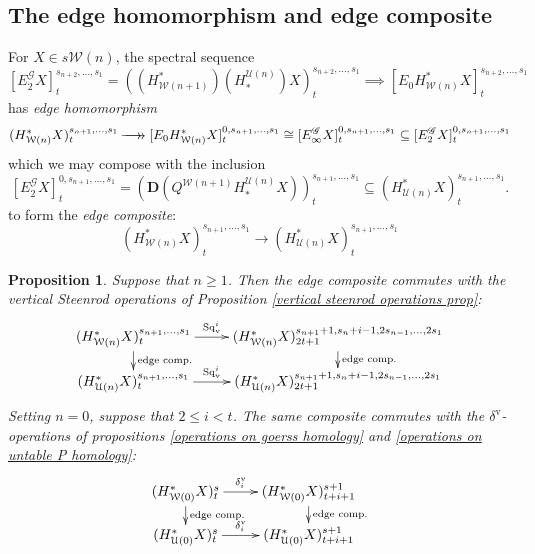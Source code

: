 \documentclass[11pt]{amsart} \renewcommand{\baselinestretch}{1.2}
\theoremstyle{plain}
\newtheorem{prop}[thm]{Proposition}
\numberwithin{equation}{section} %
\theoremstyle{plain}
\newtheorem{prop}[thm]{Proposition}
\numberwithin{equation}{chapter} %
\renewcommand{\to}{\longrightarrow}
\newcommand{\scrG}{\mathscr{G}}
\newcommand{\calU}{\mathcal{U}}
\newcommand{\calw}{\mathcal{W}}
\newcommand{\BSW}{{\scrG}}
\newcommand{\epi}{{\,\makebox[0cm][l]{\ensuremath\to}\to{}}}
\newcommand{\E}[5]{[E^{#1}_{#2}#3]^{#4}_{#5}}
\newcommand{\Edown}[4]{[E_{#1}#2]^{#3}_{#4}}
\newcommand{\uver}{^\mathrm{v}}
\newcommand{\dver}{_\mathrm{v}}
\newcommand{\Sqv}{\mathrm{Sq}\dver}
\newcommand{\deltav}{\delta\uver}
\newcommand{\dual}{\mathbf{D}}
\newcommand{\SubsectionOrSection}[1]{\subsection{#1}}
\begin{document}
\begin{Comp funct sseqs}
\SubsectionOrSection{The edge homomorphism and edge composite}
For $X\in s\calw(n)$, the spectral sequence
\[\E{\BSW}{2}{X}{s_{n+2},\ldots,s_1}{t}=((H^*_{\calw(n+1)})(H_*^{\calU(n)})X)^{s_{n+2},\ldots,s_1}_t\implies \Edown{0}{H^*_{\calw(n)}X}{s_{n+2},\ldots,s_1}{t}\]
has \emph{edge homomorphism}
\[(H^*_{\calw(n)}X)^{s_{n+1},\ldots,s_{1}}_t\epi
\Edown{0}{H^*_{\calw(n)}X}{0,s_{n+1},\ldots,s_1}{t}
\cong 
\E{\BSW}{\infty}{X}{0,s_{n+1},\ldots,s_1}{t}
\subseteq 
\E{\BSW}{2}{X}{0,s_{n+1},\ldots,s_1}{t}
\]
which we may compose with the inclusion
\[\E{\BSW}{2}{X}{0,s_{n+1},\ldots,s_1}{t}
=
(\dual(Q^{\calw(n+1)}H_*^{\calU(n)}X))^{s_{n+1},\ldots,s_1}_t\subseteq (H^*_{\calU(n)}X)^{s_{n+1},\ldots,s_1}_t.\]
to form the \emph{edge composite}:
\[(H^*_{\calw(n)}X)^{s_{n+1},\ldots,s_{1}}_t\to (H^*_{\calU(n)}X)^{s_{n+1},\ldots,s_{1}}_t\]
\begin{prop}
\label{edgehomproposition}
Suppose that $n\geq1$. Then the edge composite commutes with the vertical Steenrod operations of Proposition \ref{vertical steenrod operations prop}: %
\[\xymatrix@R=4mm{
(H^*_{\calw(n)}X)^{s_{n+1},\ldots,s_1}_t\ar[r]^-{\Sqv^i}
\ar[d]^-{\textup{edge comp.}}
&%
(H^*_{\calw(n)}X)^{s_{n+1}+1,s_n+i-1,2s_{n-1},\ldots,2s_1}_{2t+1}\ar[d]^-{\textup{edge comp.}}
\\%
(H^*_{\calU(n)}X)^{s_{n+1},\ldots,s_1}_t\ar[r]^-{\Sqv^i}
&%
(H^*_{\calU(n)}X)^{s_{n+1}+1,s_n+i-1,2s_{n-1},\ldots,2s_1}_{2t+1}
}\]
Setting $n=0$, suppose that $2\leq i <t$. The same composite commutes with the  $\deltav$-operations of propositions \ref{operations on goerss homology} and \ref{operations on untable P homology}:
\[\xymatrix@R=4mm{
(H^*_{\calw(0)}X)^{s}_t\ar[r]^-{\deltav_i}
\ar[d]^-{\textup{edge comp.}}
&%
(H^*_{\calw(0)}X)^{s+1}_{t+i+1}\ar[d]^-{\textup{edge comp.}}
\\%
(H^*_{\calU(0)}X)^{s}_t\ar[r]^-{\deltav_i}
&%
(H^*_{\calU(0)}X)^{s+1}_{t+i+1}
}\]
\end{prop}

\end{Comp funct sseqs}
\end{document}
